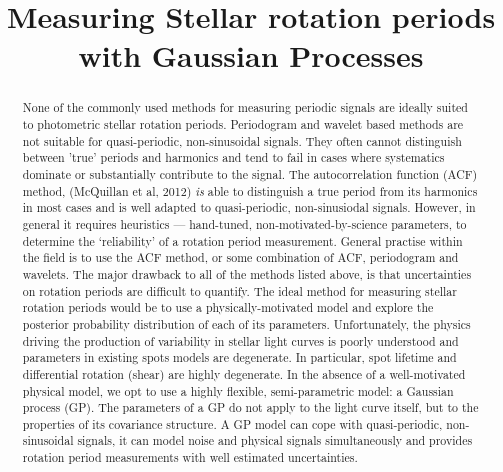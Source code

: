 \documentclass[12pt,preprint]{aastex}
\begin{document}
\title{Measuring Stellar rotation periods with Gaussian Processes}

\begin{abstract}

None of the commonly used methods for measuring periodic signals are ideally suited to photometric stellar rotation periods.
Periodogram and wavelet based methods are not suitable for quasi-periodic, non-sinusoidal signals.
They often cannot distinguish between 'true' periods and harmonics and tend to fail in cases where systematics dominate or substantially contribute to the signal.
The autocorrelation function (ACF) method, (McQuillan et al, 2012) \emph{is} able to distinguish a true period from its harmonics in most cases and is well adapted to quasi-periodic, non-sinusiodal signals.
However, in general it requires heuristics --- hand-tuned, non-motivated-by-science parameters, to determine the `reliability' of a rotation period measurement.
General practise within the field is to use the ACF method, or some combination of ACF, periodogram and wavelets. %
The major drawback to all of the methods listed above, is that uncertainties on rotation periods are difficult to quantify.
The ideal method for measuring stellar rotation periods would be to use a physically-motivated model and explore the posterior probability distribution of each of its parameters.
Unfortunately, the physics driving the production of variability in stellar light curves is poorly understood and parameters in existing spots models are degenerate.
In particular, spot lifetime and differential rotation (shear) are highly degenerate.
In the absence of a well-motivated physical model, we opt to use a highly flexible, semi-parametric model: a Gaussian process (GP).
The parameters of a GP do not apply to the light curve itself, but to the properties of its covariance structure.
A GP model can cope with quasi-periodic, non-sinusoidal signals, it can model noise and physical signals simultaneously and provides rotation period measurements with well estimated uncertainties.


\end{abstract}
\end{document}
